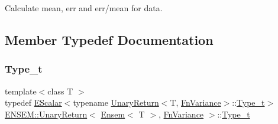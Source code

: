 Calculate mean, err and err/mean for data. 

\subsection{Member Typedef Documentation}
\mbox{\label{structENSEM_1_1UnaryReturn_3_01Ensem_3_01T_01_4_00_01FnVariance_01_4_ab460044d5646089e41eebeb2f5be9f33}} 
\subsubsection{\texorpdfstring{Type\_t}{Type\_t}\hspace{0.1cm}{\footnotesize\ttfamily [1/2]}}
{\footnotesize\ttfamily template$<$class T $>$ \\
typedef \mbox{\hyperlink{classENSEM_1_1EScalar}{E\+Scalar}}$<$typename \mbox{\hyperlink{structENSEM_1_1UnaryReturn}{Unary\+Return}}$<$T, \mbox{\hyperlink{structENSEM_1_1FnVariance}{Fn\+Variance}}$>$\+::\mbox{\hyperlink{structENSEM_1_1UnaryReturn_3_01Ensem_3_01T_01_4_00_01FnVariance_01_4_ab460044d5646089e41eebeb2f5be9f33}{Type\+\_\+t}}$>$ \mbox{\hyperlink{structENSEM_1_1UnaryReturn}{E\+N\+S\+E\+M\+::\+Unary\+Return}}$<$ \mbox{\hyperlink{classENSEM_1_1Ensem}{Ensem}}$<$ T $>$, \mbox{\hyperlink{structENSEM_1_1FnVariance}{Fn\+Variance}} $>$\+::\mbox{\hyperlink{structENSEM_1_1UnaryReturn_3_01Ensem_3_01T_01_4_00_01FnVariance_01_4_ab460044d5646089e41eebeb2f5be9f33}{Type\+\_\+t}}}

\mbox{\label{structENSEM_1_1UnaryReturn_3_01Ensem_3_01T_01_4_00_01FnVariance_01_4_ab460044d5646089e41eebeb2f5be9f33}} 
